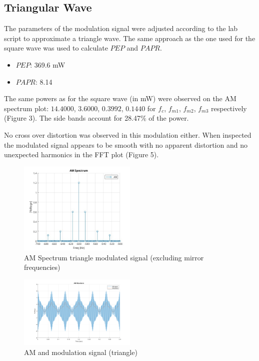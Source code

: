 \documentclass[a4paper]{article}
\begin{document}
        \newpage

        \subsection*{Triangular Wave}
        The parameters of the modulation signal were adjusted according to the lab script to approximate a triangle wave. The same approach as the one used for the square wave was used to calculate $PEP$ and $PAPR$.

        \noindent

        \begin{itemize}
            \item ${PEP}$: 369.6 mW
            \item ${PAPR}$: 8.14
        \end{itemize}

        The same powers as for the square wave (in mW) were observed on the AM spectrum plot: $14.4000$, $3.6000$, $0.3992$, $0.1440$ for $f_c$, $f_{m1}$, $f_{m2}$, $f_{m3}$ respectively (Figure 3). The side bands account for 28.47\% of the power.

        No cross over distortion was observed in this modulation either. When inspected the modulated signal appears to be smooth with no apparent distortion and no unexpected harmonics in the FFT plot (Figure 5).

        \begin{figure}[htbp]
        \centering

        \includegraphics[width=0.5\textwidth]{Images/AM_RX_1/Triangular Wave/AM Spectrum.jpg}
        \caption{AM Spectrum triangle modulated signal (excluding mirror frequencies)}

        \end{figure}

        \begin{figure}[htbp]
        \centering

        \includegraphics[width=0.5\textwidth]{Images/AM_RX_1/Triangular Wave/Full AM.png}
        \caption{AM and modulation signal (triangle)}

        \end{figure}
\end{document}

